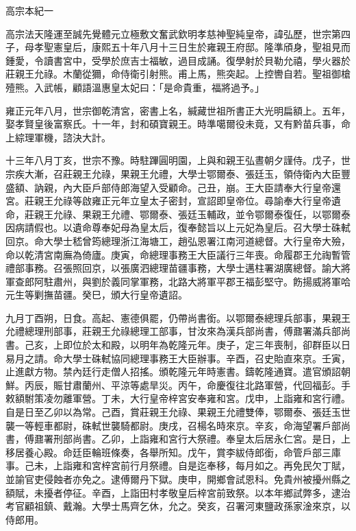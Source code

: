 
\begin{pinyinscope}
高宗本紀一

高宗法天隆運至誠先覺體元立極敷文奮武欽明孝慈神聖純皇帝，諱弘歷，世宗第四子，母孝聖憲皇后，康熙五十年八月十三日生於雍親王府邸。隆準頎身，聖祖見而鍾愛，令讀書宮中，受學於庶吉士福敏，過目成誦。復學射於貝勒允禧，學火器於莊親王允祿。木蘭從獮，命侍衛引射熊。甫上馬，熊突起。上控轡自若。聖祖御槍殪熊。入武帳，顧語溫惠皇太妃曰：「是命貴重，福將過予。」

雍正元年八月，世宗御乾清宮，密書上名，緘藏世祖所書正大光明扁額上。五年，娶孝賢皇後富察氏。十一年，封和碩寶親王。時準噶爾役未竟，又有黔苗兵事，命上綜理軍機，諮決大計。

十三年八月丁亥，世宗不豫。時駐蹕圓明園，上與和親王弘晝朝夕謹侍。戊子，世宗疾大漸，召莊親王允祿，果親王允禮，大學士鄂爾泰、張廷玉，領侍衛內大臣豐盛額、訥親，內大臣戶部侍郎海望入受顧命。己丑，崩。王大臣請奉大行皇帝還宮。莊親王允祿等啟雍正元年立皇太子密封，宣詔即皇帝位。尋諭奉大行皇帝遺命，莊親王允祿、果親王允禮、鄂爾泰、張廷玉輔政，並令鄂爾泰復任，以鄂爾泰因病請假也。以遺命尊奉妃母為皇太后，復奉懿旨以上元妃為皇后。召大學士硃軾回京。命大學士嵇曾筠總理浙江海塘工，趙弘恩署江南河道總督。大行皇帝大殮，命以乾清宮南廡為倚廬。庚寅，命總理事務王大臣議行三年喪。命履郡王允祹暫管禮部事務。召張照回京，以張廣泗總理苗疆事務，大學士邁柱署湖廣總督。諭大將軍查郎阿駐肅州，與劉於義同掌軍務，北路大將軍平郡王福彭堅守。飭揚威將軍哈元生等剿撫苗疆。癸巳，頒大行皇帝遺詔。

九月丁酉朔，日食。高起、憲德俱罷，仍帶尚書銜。以鄂爾泰總理兵部事，果親王允禮總理刑部事，莊親王允祿總理工部事，甘汝來為漢兵部尚書，傅鼐署滿兵部尚書。己亥，上即位於太和殿，以明年為乾隆元年。庚子，定三年喪制，卻群臣以日易月之請。命大學士硃軾協同總理事務王大臣辦事。辛酉，召史貽直來京。壬寅，止進獻方物。禁內廷行走僧人招搖。頒乾隆元年時憲書。鑄乾隆通寶。遣官頒詔朝鮮。丙辰，賑甘肅蘭州、平涼等處旱災。丙午，命慶復往北路軍營，代回福彭。手敕額駙策凌勿離軍營。丁未，大行皇帝梓宮安奉雍和宮。戊申，上詣雍和宮行禮。自是日至乙卯以為常。己酉，賞莊親王允祿、果親王允禮雙俸，鄂爾泰、張廷玉世襲一等輕車都尉，硃軾世襲騎都尉。庚戌，召楊名時來京。辛亥，命海望署戶部尚書，傅鼐署刑部尚書。乙卯，上詣雍和宮行大祭禮。奉皇太后居永仁宮。是日，上移居養心殿。命廷臣輪班條奏，各舉所知。戊午，賞李紱侍郎銜，命管戶部三庫事。己未，上詣雍和宮梓宮前行月祭禮。自是迄奉移，每月如之。再免民欠丁賦，並諭官吏侵蝕者亦免之。逮傅爾丹下獄。庚申，開鄉會試恩科。免貴州被擾州縣之額賦，未擾者停征。辛酉，上詣田村孝敬皇后梓宮前致祭。以本年鄉試弊多，逮治考官顧祖鎮、戴瀚。大學士馬齊乞休，允之。癸亥，召署河東鹽政孫家淦來京，以侍郎用。


\end{pinyinscope}
